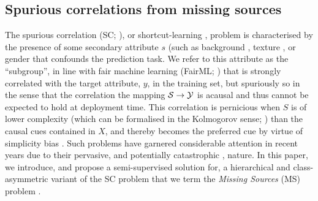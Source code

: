 \subsection{Spurious correlations from missing sources}\label{ssec:walkthrough}
The spurious correlation (SC; \cite{arjovsky2019invariant}), or shortcut-learning
\citep{valle2018deep, geirhos2020shortcut}, problem is characterised by the presence of some
secondary attribute \(s\) (such as background \citep{beery2018recognition}, texture
\citep{geirhos2018imagenet}, or gender \citep{sagawa2019distributionally, seyyed2020chexclusion}
that confounds the prediction task.
%
We refer to this attribute as the ``subgroup'', in line with fair machine learning (FairML;
\citet{barocas-hardt-narayanan}) that is strongly correlated with the target attribute, \(y\), in
the training set, but spuriously so in the sense that the correlation the mapping \( {\mathcal{S}} \to {\mathcal{Y}} \)
is acausal and thus cannot be expected to hold at deployment time. 
%
This correlation is pernicious when \(S\) is of lower complexity (which can be formalised in the
Kolmogorov sense; \citet{scimeca2021shortcut}) than the causal cues contained in \(X\), and thereby
becomes the preferred cue by virtue of simplicity bias \citep{valle2018deep}. 
%
Such problems have garnered considerable attention in recent years \citep{liu2021just,
pezeshki2021gradient, SohDunAngGuetal20, krueger2021out} due to their pervasive, and potentially
catastrophic \citep{codevilla2019exploring, de2019causal, castro2020causality}, nature.
%
In this paper, we introduce, and propose a semi-supervised solution for, a hierarchical and
class-asymmetric variant of the SC problem that we term the \emph{Missing Sources} (MS) problem .

